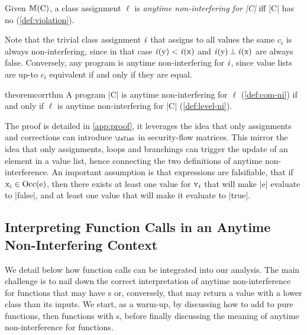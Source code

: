 \begin{definition}%
\label{def:level-ni}
Given $\sfm{\prc|C|}$, a class assignment \(\ell\) is
\emph{anytime non-interfering for
\prc|C|} iff \prc|C| has no  (\autoref{def:violation}).
\end{definition}

Note that the trivial class assignment \(\mathit{i}\) that assigns to all values
the same  \(c_i\) is always
non-interfering, since in that case \(\scl{i}(\prc|y|) <
\scl{i}(\prc|x|)\) and \(\scl{i}(\prc|y|) \orth \scl{i}(\prc|x|)\) are always
false. Conversely, any program is anytime
non-interfering for \(\mathit{i}\), since value
lists are up-to \(c_i\) equivalent if and only if they are equal.

\begin{restatable}[Correspondance]{theorem}{corrthm}\label{thm:corr}
A program \prc|C| is anytime
non-interfering for \(\ell\)
(\autoref{def:com-ni}) if and only if \(\ell\) is anytime non-interfering for
\prc|C| (\autoref{def:level-ni}).
\end{restatable}

The proof is detailed in \autoref{app:proof}, it leverages the idea that only
assignments and corrections can introduce \(\vi\) in security-flow
matrices. This mirror the idea that only assignments, loops and branchings can
trigger the update of an element in a value list, hence connecting the two
definitions of anytime non-interference. An
important assumption is that expressions are falsifiable, \eg that if
\ensuremath{\prc|x$_i$| \in \Occ(\prc|e|)}, then there
exists at least one value for \ensuremath{\prc|v$_i$|} that will make \prc|e|
evaluate to \prc|false|, and at least one value that will make it evaluate to
\prc|true|.

\subsection{Interpreting Function Calls in an Anytime Non-Interfering Context}
\label{sec:fct-calls}

We detail below how function calls can be integrated into our analysis. The main
challenge is to nail down the correct interpretation of anytime
non-interference for functions that may have
s or, conversely, that may return a value with a lower class
than its inputs. We start, as a warm-up, by discussing how to add to \lname pure
functions, then functions with s, before finally discussing the
meaning of anytime non-interference for
functions.

